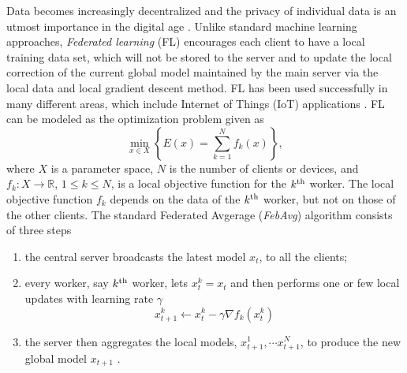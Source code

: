 \begin{itemize}
Data becomes increasingly decentralized and the privacy of individual data is an utmost importance in the digital age \cite{house2012consumer, cai2021deepstroke,chen2020ai,luo2020arbee,wang2020panel}. Unlike standard machine learning approaches, \textit{Federated learning} (FL) encourages each client to have a local training data set, which will not be stored to the server and  to update the local correction of the current global model maintained by the main server via the local data and local gradient descent method. {FL} has been used successfully in many different areas, which include Internet of Things (IoT) applications \cite{hwang2015iot, ferrag2021federated}. {FL} can be modeled as the optimization problem given as 
\begin{equation}\label{FL}
\min_{x \in X} \left \{ E(x) = \sum_{k=1}^N f_k (x) \right \},
\end{equation} 
where $X$ is a parameter space, $N$ is the number of clients or devices, and $f_k \colon X \rightarrow \mathbb{R}$, $1 \leq k \leq N$, is a local objective function for the $k^{\rm th}$ worker. The local objective function $f_k$ depends on the data of the $k^{\rm th}$ worker, but not on those of the other clients. The standard Federated Avgerage ({\textit{FebAvg}}) algorithm consists of three steps
\begin{enumerate}
\item  the central server broadcasts the latest model $x_t$, to all the clients;
\item every worker, say $k^{\rm th}$ worker, lets $x_t^k = x_t$ and then performs one or few local updates with learning rate $\gamma$ 
  $$x_{t+1}^k \leftarrow x_t^k - \gamma \nabla f_k(x_t^k)$$
\item the server then aggregates the local models, $x_{t+1}^1, \cdots x_{t+1}^N$, to produce the new global model $x_{t+1}$ \cite{konevcny2016federated}.
  \end{enumerate}


\end{itemize}

